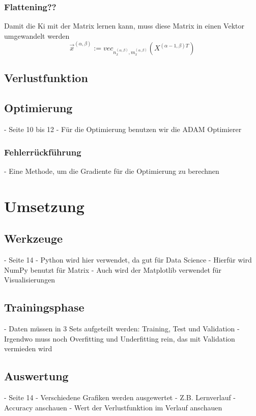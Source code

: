 \documentclass[11pt]{article}
\begin{document}
\subsubsection{Flattening??}
Damit die Ki mit der Matrix lernen kann, muss diese Matrix in einen Vektor umgewandelt werden
\begin{equation}
    \vec{x}^{(\alpha,\beta)} := vec_{n_{x}^{(\alpha,\beta)}, m_{x}^{(\alpha,\beta)}}(X^{(\alpha-1,\beta)T})
\end{equation}

\subsection{Verlustfunktion}

\subsection{Optimierung}
- Seite 10 bis 12
- Für die Optimierung benutzen wir die ADAM Optimierer
\subsubsection{Fehlerrückführung}
- Eine Methode, um die Gradiente für die Optimierung zu berechnen

\section{Umsetzung}

\subsection{Werkzeuge}
- Seite 14
- Python wird hier verwendet, da gut für Data Science
- Hierfür wird NumPy benutzt für Matrix
- Auch wird der Matplotlib verwendet für Visualisierungen

\subsection{Trainingsphase}
- Daten müssen in 3 Sets aufgeteilt werden: Training, Test und Validation
- Irgendwo muss noch Overfitting und Underfitting rein, das mit Validation vermieden wird

\subsection{Auswertung}
- Seite 14
- Verschiedene Grafiken werden ausgewertet
- Z.B. Lernverlauf
- Accuracy anschauen
- Wert der Verlustfunktion im Verlauf anschauen
\end{document}
